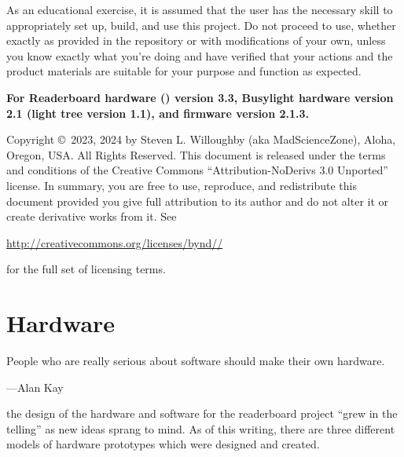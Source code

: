 As an educational exercise, it is assumed that the user has the necessary skill to appropriately set up, build,
and use this project. Do not proceed to use, whether exactly as provided in the repository or with modifications
of your own, unless you know exactly what you're doing and have verified that your actions and the product
materials are suitable for your purpose and function as expected.

\strut\vfill

\begin{center}\bfseries
	For Readerboard hardware () version 3.3, %
	Busylight hardware version 2.1 (light tree version 1.1), and firmware version 2.1.3.
\end{center}

\strut\vfill

\noindent Copyright \copyright\ 2023, 2024 by Steven L. Willoughby
(aka MadScienceZone), Aloha, Oregon, USA. All Rights Reserved.
This document is released under the terms and conditions of the
Creative Commons ``Attribution-NoDerivs 3.0 Unported'' license.
In summary, you are free to use, reproduce, and redistribute this 
document provided you give full attribution to its author and do not
alter it or create derivative works from it.  See
\begin{center}
\href{http://creativecommons.org/licenses/by-nd-3.0}{http://creativecommons.org/licenses/by\-nd\-//} 
\end{center}
for the full set of licensing terms.

\begin{center}
\end{center}

\newpage
\tableofcontents
\newpage
\listoffigures
\listoftables
\mainmatter

%
\chapter{Hardware}
\epigraph{People who are really serious about software should make their own hardware.}{---Alan Kay}
 the design of the hardware and software for the read\-erboard
project ``grew in the telling'' as new ideas sprang to mind. As of this writing, there are three
different models of hardware prototypes which were designed and created.

